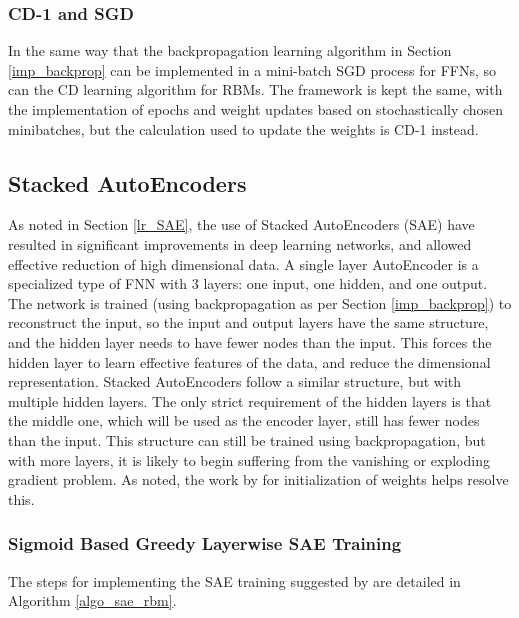 \documentclass[a4paper,11pt,oneside]{article}
\theoremstyle{plain}
\theoremstyle{definition}
\begin{document}
	\subsubsection{CD-1 and SGD}
	
	In the same way that the backpropagation learning algorithm in Section \ref{imp_backprop} can be implemented in a mini-batch SGD process for FFNs, so can the CD learning algorithm for RBMs. The framework is kept the same, with the implementation of epochs and weight updates based on stochastically chosen minibatches, but the calculation used to update the weights is CD-1 instead.
	
	
	\subsection{Stacked AutoEncoders}\label{imp_SAE}
	
	As noted in Section \ref{lr_SAE}, the use of Stacked AutoEncoders (SAE) have resulted in significant improvements in deep learning networks, and allowed effective reduction of high dimensional data. A single layer AutoEncoder is a specialized type of FNN with 3 layers: one input, one hidden, and one output. The network is trained (using backpropagation as per Section \ref{imp_backprop}) to reconstruct the input, so the input and output layers have the same structure, and the hidden layer needs to have fewer nodes than the input. This forces the hidden layer to learn effective features of the data, and reduce the dimensional representation. 
	\newline\newline
	Stacked AutoEncoders follow a similar structure, but with multiple hidden layers. The only strict requirement of the hidden layers is that the middle one, which will be used as the encoder layer, still has fewer nodes than the input. This structure can still be trained using backpropagation, but with more layers, it is likely to begin suffering from the vanishing or exploding gradient problem. As noted, the work by \citet{Hinton2} for initialization of weights helps resolve this.
	
	\subsubsection{Sigmoid Based Greedy Layerwise SAE Training}\label{imp_sigmoidsae}
	
	The steps for implementing the SAE training suggested by \citet{Hinton2} are detailed in Algorithm \ref{algo_sae_rbm}.\newline
	
\end{document}
